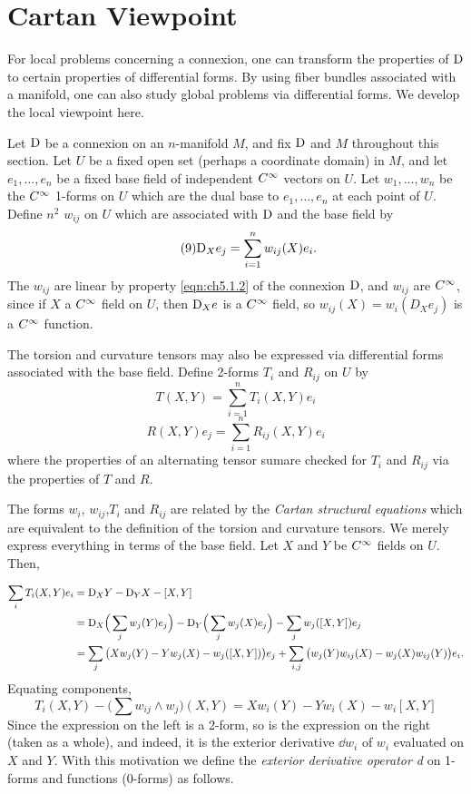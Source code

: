 \documentclass[../main]{subfiles}
\begin{document}
\section{Cartan Viewpoint}\label{ch05:s2}

For local problems concerning a connexion, one can transform the properties of $\mathrm{D}$ to certain properties of differential forms. By using fiber bundles associated with a manifold, one can also study global problems via differential forms. We develop the local viewpoint here.

Let $\mathrm{D}$ be a connexion on an $n$-manifold $M$, and fix $\mathrm{D}$ and $M$ throughout this section. Let $U$ be a fixed open set (perhaps a coordinate domain) in $M$, and let $e_1,\dots,e_n$ be a fixed base field of independent $C^\infty$ vectors on $U$. Let $w_1,\dots,w_n$ be the $C^\infty$ 1-forms on $U$ which are the dual base to $e_1,\dots,e_n$ at each point of $U$. Define $n^2$  $w_{ij}$ on $U$ which are associated with $\mathrm{D}$ and the base field by
\begin{equation}\label{eq:ch05.9}
\tag{9}
\mathrm{D}_X e_j = \sum_{i=1}^n w_{ij} (X)e_i.
\end{equation}
The $w_{ij}$ are linear by property \ref{eqn:ch5.1.2} of the connexion $\mathrm{D}$, and $w_{ij}$ are $C^\infty$, since if $X$ a $C^\infty$ field on $U$, then $\mathrm{D}_X e$ is a $C^\infty$ field, so $w_{ij}(X) = w_i(D_X e_j)$ is a $C^\infty$ function.

The torsion and curvature tensors may also be expressed via differential forms associated with the base field. Define 2-forms $T_i$ and $R_{ij}$ on $U$ by
\[\label{eqn:ch05.10}\tag{10} T(X,Y) = \sum_{i=1}^n T_i(X,Y)e_i\]
\[\label{eqn:ch05.11}\tag{11} R(X,Y)e_j = \sum_{i=1}^n R_{ij}(X,Y)e_i\]
where the properties of an alternating tensor sumare checked for $T_i$ and $R_{ij}$ via the properties of $T$ and $R$.

The forms $w_i$, $w_{ij}$,$T_i$ and $R_{ij}$ are related by the \emph{Cartan structural equations} which are equivalent to the definition of the torsion and curvature tensors. We merely express everything in terms of the base field. Let $X$ and $Y$ be $C^\infty$ fields on $U$. Then,

\begin{align*}
    \sum_i T_i(X,Y)e_i &= \mathrm{D}_XY-\mathrm{D}_YX -[X,Y]\\
    &= \mathrm{D}_X\Big(\sum_j w_j(Y)e_j\Big) - \mathrm{D}_Y\Big(\sum_j w_j(X)e_j\Big) - \sum_j w_j([X,Y])e_j\\
    &= \sum_j \big(Xw_j(Y)-Yw_j(X)-w_j([X,Y])\big)e_j
       + \sum_{i,j}\big(w_j(Y)w_{ij}(X)-w_j(X)w_{ij}(Y)\big)e_i.
\end{align*}
Equating components,
\[T_i(X,Y) - \Big(\sum w_{ij}\wedge w_j\Big)(X,Y) = Xw_i(Y) -Yw_i(X) - w_i[X,Y] \]
Since the expression on the left is a 2-form, so is the expression on the right (taken as a whole), and indeed, it is the exterior derivative $\dd w_i$ of $w_i$ evaluated on $X$ and $Y$. With this motivation we define the \emph{exterior derivative operator d} on 1-forms and functions (0-forms) as follows.
\end{document}
